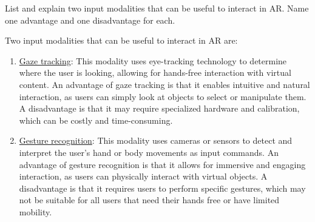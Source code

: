 \begin{ejercicio}
    List and explain two input modalities that can be useful to interact in AR. Name one advantage and one disadvantage for each.

    Two input modalities that can be useful to interact in AR are:
    \begin{enumerate}
        \item \ul{Gaze tracking}: This modality uses eye-tracking technology to determine where the user is looking, allowing for hands-free interaction with virtual content. An advantage of gaze tracking is that it enables intuitive and natural interaction, as users can simply look at objects to select or manipulate them. A disadvantage is that it may require specialized hardware and calibration, which can be costly and time-consuming.
        \item \ul{Gesture recognition}: This modality uses cameras or sensors to detect and interpret the user's hand or body movements as input commands. An advantage of gesture recognition is that it allows for immersive and engaging interaction, as users can physically interact with virtual objects. A disadvantage is that it requires users to perform specific gestures, which may not be suitable for all users that need their hands free or have limited mobility.
    \end{enumerate}
\end{ejercicio}

